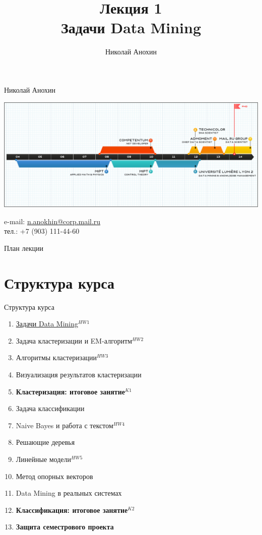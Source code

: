 \documentclass[aspectratio=169]{beamer}
\author{Николай Анохин}
\title{\newline \newline \newline Лекция 1 \\ Задачи Data Mining}
\let\otp\titlepage
\renewcommand{\titlepage}{\otp\addtocounter{framenumber}{-1}}
\begin{document}
\begin{frame}[plain]
\titlepage
\end{frame}

\begin{frame}{Николай Анохин}

\begin{center}
\includegraphics[scale=0.325]{images/timeline.png}
\end{center}

\begin{footnotesize}
e-mail: \href{mailto:n.anokhin@corp.mail.ru}{n.anokhin@corp.mail.ru} \\
тел.: +7 (903) 111-44-60
\end{footnotesize}

\end{frame}

\begin{frame}{План лекции}
\tableofcontents
\end{frame}

\section{Структура курса}

\begin{frame}{Структура курса}

{\small
\begin{enumerate}
\item \underline{Задачи Data Mining}{\color{red}$^{HW1}$}
\item Задача кластеризации и EM-алгоритм{\color{red}$^{HW2}$}
\item Алгоритмы кластеризации{\color{red}$^{HW3}$}
\item Визуализация результатов кластеризации
\item \textbf{Кластеризация: итоговое занятие}{\color{red}$^{K1}$}
\item Задача классификации
\item Naive Bayes и работа с текстом{\color{red}$^{HW4}$}
\item Решающие деревья
\item Линейные модели{\color{red}$^{HW5}$}
\item Метод опорных векторов
\item Data Mining в реальных системах
\item \textbf{Классификация: итоговое занятие}{\color{red}$^{K2}$}
\item \textbf{Защита семестрового проекта}
\end{enumerate}
}

\end{frame}
\end{document}
